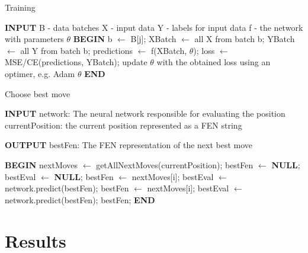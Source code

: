 \documentclass[runningheads,a4paper,11pt]{report}
\begin{document}
\clearpage
\begin{algorithm}
	\caption{Training}
	\label{BestMove}
		\begin{algorithmic}
        
        \STATE \textbf{INPUT}
        \STATE B - data batches
        \STATE X - input data
        \STATE Y - labels for input data
        \STATE f - the network with parameters $\theta$
        \STATE \textbf{BEGIN}
                \STATE b $\leftarrow$ B[j];
                \STATE XBatch $\leftarrow$ all X from batch b;
                \STATE YBatch $\leftarrow$ all Y from batch b;
                \STATE predictions $\leftarrow$ f(XBatch, $\theta$);
                \STATE loss $\leftarrow$ MSE/CE(predictions, YBatch);
                \STATE update $\theta$ with the obtained loss using an optimer, e.g. Adam
            \ENDFOR
        \ENDFOR
        \RETURN $\theta$
  		\STATE \textbf{END}
\end{algorithmic}
\end{algorithm}


\begin{algorithm}
	\caption{Choose best move}
	\label{BestMove}
		\begin{algorithmic}
        
        \STATE \textbf{INPUT}
        \STATE  network: The neural network responsible for evaluating the                       position
        \STATE currentPosition: the current position represented as a FEN string
        
        \STATE \textbf{OUTPUT}
        \STATE  bestFen: The FEN representation of the next best move 
        
		\STATE \textbf{BEGIN}
  		\STATE nextMoves $\leftarrow$ getAllNextMoves(currentPosition);
  		\STATE bestFen $\leftarrow$ \textbf{NULL};
  		\STATE bestEval $\leftarrow$ \textbf{NULL};
  		        \STATE bestFen $\leftarrow$ nextMoves[i];
  		        \STATE bestEval $\leftarrow$ network.predict(bestFen);
  		        \STATE bestFen $\leftarrow$ nextMoves[i];
  		        \STATE bestEval $\leftarrow$ network.predict(bestFen);
  		    \ENDIF
  		\ENDFOR
  		\RETURN bestFen;
  		\STATE \textbf{END}
\end{algorithmic}
\end{algorithm}

\chapter{Results}
\end{document}
